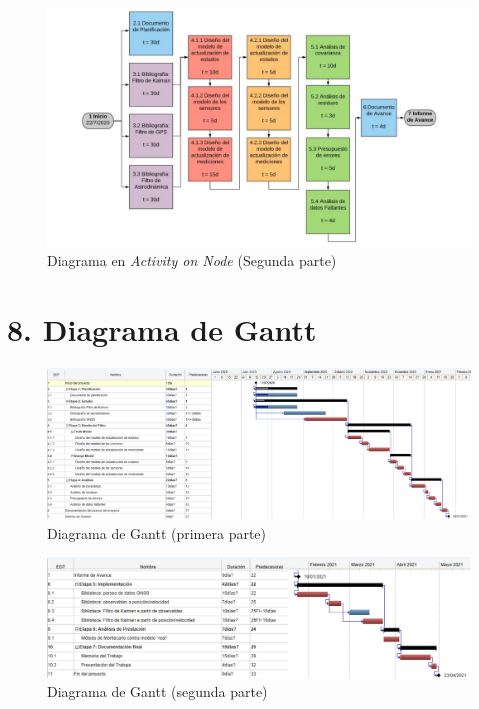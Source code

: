 \documentclass[11pt]{charter}
\begin{document}
\begin{figure}[H]
\centering 
\includegraphics[page=2, width=\textwidth]{./Figuras/AoN.pdf}
\caption{Diagrama en \textit{Activity on Node} (Segunda parte)}
\label{fig:AoN}
\end{figure}


\section{8. Diagrama de Gantt}
\label{sec:gantt}

\begin{figure}[H]
\centering 
\includegraphics[width=1.4\textwidth, angle =90]{./Figuras/Gantt1.pdf}
\caption{Diagrama de Gantt (primera parte)}
\label{fig:Gantt}
\end{figure}

\begin{figure}[H]
\centering 
\includegraphics[width=\textwidth]{./Figuras/Gantt2.pdf}
\caption{Diagrama de Gantt (segunda parte)}
\label{fig:Gantt}
\end{figure}
\end{document}

